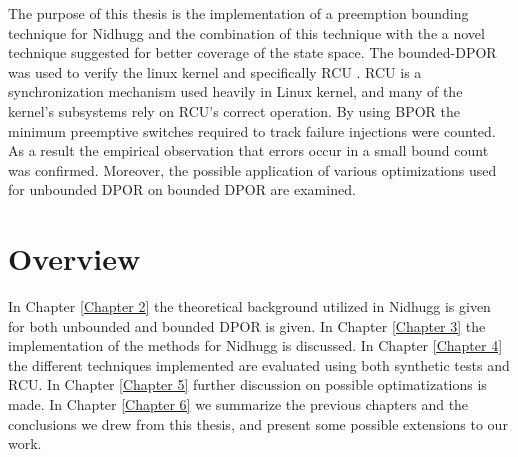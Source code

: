 The purpose of this thesis is the implementation of a preemption bounding technique \cite{BPOR} for Nidhugg and the combination
of this technique with the a novel technique \cite{AbdullaAronisJohnssonSagonasDPOR2014} suggested for better coverage of the state space.
The bounded-DPOR was used to verify the linux kernel \cite{LinuxKernel} and specifically RCU \cite{Spin}. RCU is a synchronization
mechanism used heavily in Linux kernel, and many of the kernel’s subsystems rely on RCU’s correct operation. By using BPOR the minimum preemptive
switches required to track failure injections were counted. As a result the empirical observation that errors occur in a small bound count was confirmed.
Moreover, the possible application of various optimizations used for unbounded DPOR on bounded DPOR are examined. 

\section{Overview}
In Chapter \ref{Chapter 2} the theoretical background utilized in Nidhugg is given for both unbounded and bounded DPOR is given.
In Chapter \ref{Chapter 3} the implementation of the methods for Nidhugg is discussed. In Chapter \ref{Chapter 4} the different techniques
implemented are evaluated using both synthetic tests and RCU. In Chapter \ref{Chapter 5} further discussion on possible optimatizations
is made. In Chapter \ref{Chapter 6} we summarize the previous chapters and the conclusions
we drew from this thesis, and present some possible extensions to our work.
